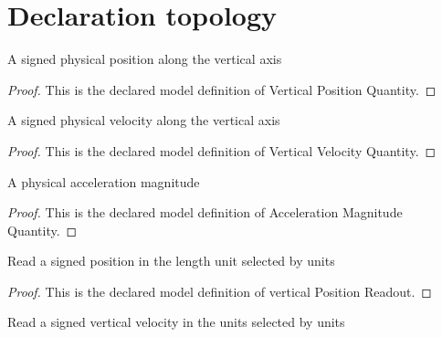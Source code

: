 \section{Declaration topology}
\begin{definition}
  \label{def:physics:phyx-mini-0754:phyxminiproblems-problemphyxmini0754-verticalpositionquantity}
  A signed physical position along the vertical axis
\end{definition}
\begin{proof}
  This is the declared model definition of Vertical Position Quantity.
\end{proof}
\begin{definition}
  \label{def:physics:phyx-mini-0754:phyxminiproblems-problemphyxmini0754-verticalvelocityquantity}
  A signed physical velocity along the vertical axis
\end{definition}
\begin{proof}
  This is the declared model definition of Vertical Velocity Quantity.
\end{proof}
\begin{definition}
  \label{def:physics:phyx-mini-0754:phyxminiproblems-problemphyxmini0754-accelerationmagnitudequantity}
  A physical acceleration magnitude
\end{definition}
\begin{proof}
  This is the declared model definition of Acceleration Magnitude Quantity.
\end{proof}
\begin{definition}
  \label{def:physics:phyx-mini-0754:phyxminiproblems-problemphyxmini0754-verticalpositionreadout}
  Read a signed position in the length unit selected by units
\end{definition}
\begin{proof}
  This is the declared model definition of vertical Position Readout.
\end{proof}
\begin{definition}
  \label{def:physics:phyx-mini-0754:phyxminiproblems-problemphyxmini0754-verticalvelocityreadout}
  Read a signed vertical velocity in the units selected by units
\end{definition}
